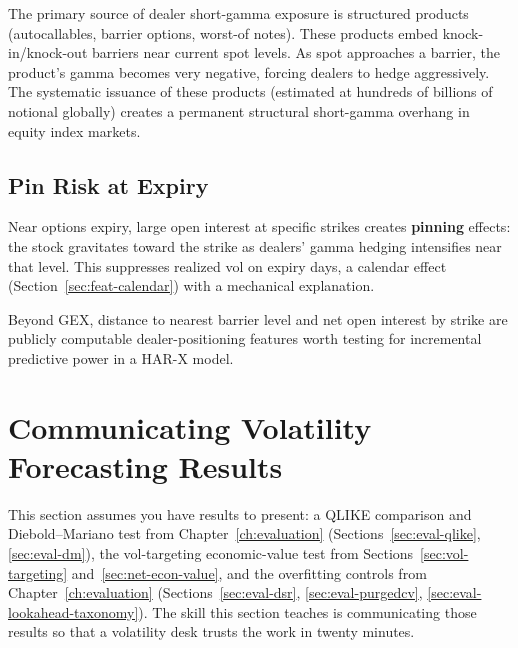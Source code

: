 The primary source of dealer short-gamma exposure is structured products (autocallables, barrier options, worst-of notes).
These products embed knock-in/knock-out barriers near current spot levels.
As spot approaches a barrier, the product's gamma becomes very negative, forcing dealers to hedge aggressively.
The systematic issuance of these products (estimated at hundreds of billions of notional globally) creates a permanent structural short-gamma overhang in equity index markets.

\subsection{Pin Risk at Expiry}

Near options expiry, large open interest at specific strikes creates \textbf{pinning} effects: the stock gravitates toward the strike as dealers' gamma hedging intensifies near that level.
This suppresses realized vol on expiry days, a calendar effect (Section~\ref{sec:feat-calendar}) with a mechanical explanation.

\begin{application}
Beyond GEX, distance to nearest barrier level and net open interest by strike are publicly computable dealer-positioning features worth testing for incremental predictive power in a HAR-X model.
\end{application}


\section{Communicating Volatility Forecasting Results}
\label{sec:communicating-results}

\begin{prereq}[Background]
This section assumes you have results to present: a QLIKE comparison and Diebold--Mariano test from Chapter~\ref{ch:evaluation} (Sections~\ref{sec:eval-qlike}, \ref{sec:eval-dm}), the vol-targeting economic-value test from Sections~\ref{sec:vol-targeting} and~\ref{sec:net-econ-value}, and the overfitting controls from Chapter~\ref{ch:evaluation} (Sections~\ref{sec:eval-dsr}, \ref{sec:eval-purgedcv}, \ref{sec:eval-lookahead-taxonomy}). The skill this section teaches is communicating those results so that a volatility desk trusts the work in twenty minutes.
\end{prereq}

